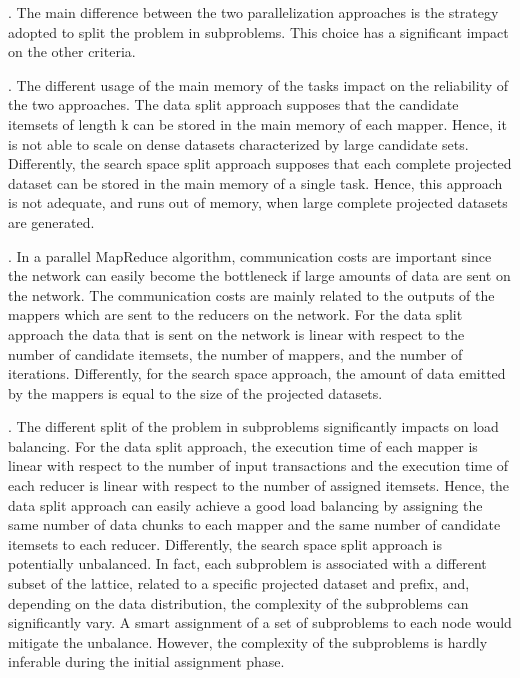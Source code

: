 . 
The main difference between the two parallelization approaches is the strategy adopted to split the problem in subproblems. This choice has a significant impact on the other criteria.

. 
The different usage of the main memory of the tasks impact on the reliability of the two approaches. The data split approach supposes that the candidate itemsets of length k can be stored in the main memory of each mapper. Hence, it is not able to scale on dense datasets
characterized by large candidate sets. Differently, the search space split approach supposes that each complete projected dataset can be stored in the main memory of a single task. Hence, this approach is not adequate, and runs out of memory, when large complete projected datasets are generated.  

. In a parallel MapReduce algorithm, communication costs are important since the network can easily become the bottleneck if large amounts of data are sent on the network.
The communication costs are mainly related to the outputs of the mappers which are sent to the reducers on the network. 
For the data split approach the data that is sent on the network is linear with respect 
to the number of candidate itemsets, the number of mappers, and the number of iterations.
Differently, for the search space approach, the amount of data emitted by the mappers is equal to the size of the projected datasets. 


. 
The different split of the problem in subproblems significantly impacts on load balancing. For the data split approach, the execution time of each mapper 
is linear with respect to the number of input transactions and the execution time of each reducer is linear with respect to the number of assigned itemsets.
Hence, the data split approach can easily achieve a good load balancing by assigning the same number of data chunks to each mapper and the same number of candidate itemsets to each reducer. 
Differently, the search space split approach is potentially unbalanced. In fact, each subproblem is associated with a different subset of the lattice, related to a specific projected dataset and prefix, and, depending on the data distribution, the complexity of the subproblems can significantly vary. 
A smart assignment of a set of subproblems to each node would mitigate the unbalance. However, the complexity of the subproblems is hardly inferable during the initial assignment phase.

